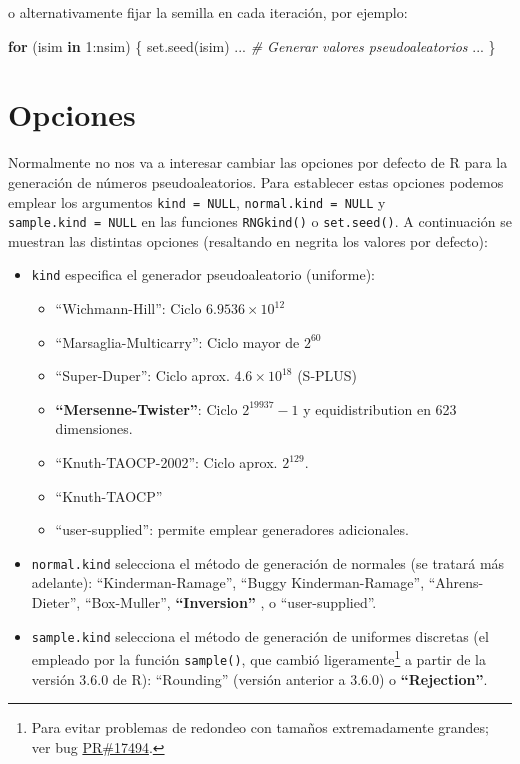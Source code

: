 \documentclass[
]{book}
\newenvironment{Shaded}{\begin{snugshade}}{\end{snugshade}}
\newcommand{\CommentTok}[1]{\textcolor[rgb]{0.56,0.35,0.01}{\textit{#1}}}
\newcommand{\ControlFlowTok}[1]{\textcolor[rgb]{0.13,0.29,0.53}{\textbf{#1}}}
\newcommand{\DecValTok}[1]{\textcolor[rgb]{0.00,0.00,0.81}{#1}}
\newcommand{\FunctionTok}[1]{\textcolor[rgb]{0.00,0.00,0.00}{#1}}
\newcommand{\NormalTok}[1]{#1}
\newcommand{\SpecialCharTok}[1]{\textcolor[rgb]{0.00,0.00,0.00}{#1}}
\theoremstyle{break}
\theoremstyle{definition}
\theoremstyle{definition}
\theoremstyle{definition}
\theoremstyle{definition}
\theoremstyle{remark}
\begin{document}
o alternativamente fijar la semilla en cada iteración, por ejemplo:

\begin{Shaded}
\begin{Highlighting}[]
\ControlFlowTok{for}\NormalTok{ (isim }\ControlFlowTok{in} \DecValTok{1}\SpecialCharTok{:}\NormalTok{nsim) \{}
  \FunctionTok{set.seed}\NormalTok{(isim)}
\NormalTok{  ...}
  \CommentTok{\# Generar valores pseudoaleatorios}
\NormalTok{  ...}
\NormalTok{\}}
\end{Highlighting}
\end{Shaded}

\hypertarget{opciones}{%
\section{Opciones}\label{opciones}}

Normalmente no nos va a interesar cambiar las opciones por defecto de R para la generación de números pseudoaleatorios.
Para establecer estas opciones podemos emplear los argumentos \texttt{kind\ =\ NULL}, \texttt{normal.kind\ =\ NULL} y \texttt{sample.kind\ =\ NULL} en las funciones \texttt{RNGkind()} o \texttt{set.seed()}.
A continuación se muestran las distintas opciones (resaltando en negrita los valores por defecto):

\begin{itemize}
\item
  \texttt{kind} especifica el generador pseudoaleatorio (uniforme):

  \begin{itemize}
  \item
    ``Wichmann-Hill'': Ciclo \(6.9536\times10^{12}\)
  \item
    ``Marsaglia-Multicarry'': Ciclo mayor de \(2^{60}\)
  \item
    ``Super-Duper'': Ciclo aprox. \(4.6\times10^{18}\) (S-PLUS)
  \item
    \textbf{``Mersenne-Twister''}: Ciclo \(2^{19937}-1\) y equidistribution
    en 623 dimensiones.
  \item
    ``Knuth-TAOCP-2002'': Ciclo aprox. \(2^{129}\).
  \item
    ``Knuth-TAOCP''
  \item
    ``user-supplied'': permite emplear generadores adicionales.
  \end{itemize}
\item
  \texttt{normal.kind} selecciona el método de generación de normales
  (se tratará más adelante):
  ``Kinderman-Ramage'', ``Buggy Kinderman-Ramage'',
  ``Ahrens-Dieter'', ``Box-Muller'', \textbf{``Inversion''} , o ``user-supplied''.
\item
  \texttt{sample.kind} selecciona el método de generación de uniformes discretas (el empleado por la función \texttt{sample()}, que cambió ligeramente\footnote{Para evitar problemas de redondeo con tamaños extremadamente grandes; ver bug \href{https://bugs.r-project.org/bugzilla3/show_bug.cgi?id=17494}{PR\#17494}.} a partir de la versión 3.6.0 de R): ``Rounding'' (versión anterior a 3.6.0) o \textbf{``Rejection''}.
\end{itemize}
\end{document}
